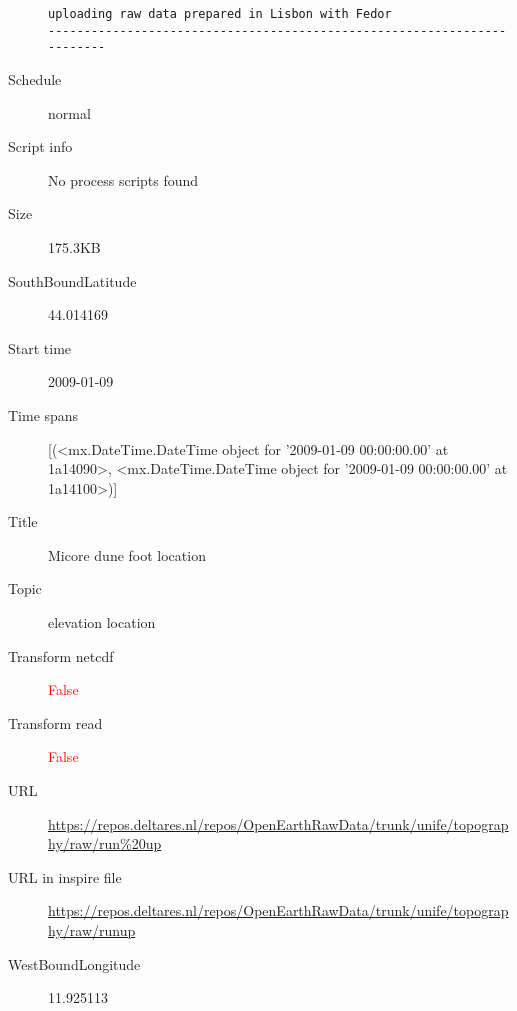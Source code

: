 \documentclass[9]{report}
\begin{document}
\begin{description}
\begin{verbatim}
uploading raw data prepared in Lisbon with Fedor
------------------------------------------------------------------------

\end{verbatim}
  \item[Schedule] normal
  \item[Script info] No process scripts found
  \item[Size] 175.3KB
  \item[SouthBoundLatitude] 44.014169
  \item[Start time] 2009-01-09
  \item[Time spans] [(<mx.DateTime.DateTime object for '2009-01-09 00:00:00.00' at 1a14090>, <mx.DateTime.DateTime object for '2009-01-09 00:00:00.00' at 1a14100>)]
  \item[Title]  Micore dune foot location 
  \item[Topic] elevation location
  \item[Transform netcdf] \textcolor{red}{False}
  \item[Transform read] \textcolor{red}{False}
  \item[URL] \href{https://repos.deltares.nl/repos/OpenEarthRawData/trunk/unife/topography/raw/run\%20up}{https://repos.deltares.nl/repos/OpenEarthRawData/trunk/unife/topography/raw/run\%20up}
  \item[URL in inspire file] \href{https://repos.deltares.nl/repos/OpenEarthRawData/trunk/unife/topography/raw/runup}{https://repos.deltares.nl/repos/OpenEarthRawData/trunk/unife/topography/raw/runup}
  \item[WestBoundLongitude] 11.925113
\end{description}
\end{document}
